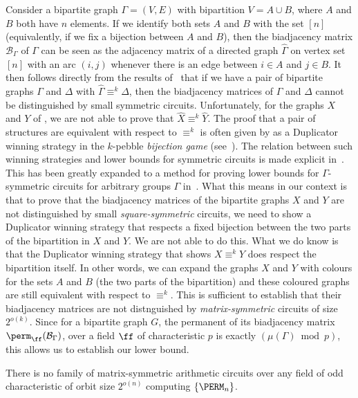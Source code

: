 \documentclass{toc}
\begin{document}
Consider a bipartite graph $\Gamma= (V,E)$ with bipartition $V= A \cup B$,
where $A$ and $B$ both have $n$ elements.  If we identify both sets
$A$ and $B$ with the set $[n]$ (equivalently, if we fix a bijection
between $A$ and $B$), then the biadjacency matrix $\mathcal{B}_\Gamma$ of
$\Gamma$ can be seen as the adjacency matrix of a directed graph $\hat{\Gamma}$
on vertex set $[n]$ with an arc $(i,j)$ whenever there is an edge
between $i \in A$ and $j \in B$.  It then follows directly from the
results of~\cite{AndersonD17} that if we have a pair of bipartite graphs $\Gamma$ and $\Delta$ with $\hat{\Gamma} \equiv^k \hat{\Delta}$, then the biadjacency matrices of $\Gamma$ and $\Delta$ cannot be distinguished by small symmetric circuits.  Unfortunately, for the graphs $X$ and $Y$ of , we are not able to prove that $\hat{X} \equiv^k \hat{Y}$. 
The proof that a pair of structures are equivalent with respect to $\equiv^k$ is often given by as a Duplicator winning strategy in the $k$-pebble \emph{bijection game} (see~\cite{DR07}).  The relation between such winning strategies and lower bounds for symmetric circuits is made explicit in~\cite{Dawar2016}.  This has been greatly expanded to a method for proving  lower bounds for $\Gamma$-symmetric circuits for arbitrary groups $\Gamma$ in~\cite{DWitcs22}.  What this means in our context is that to prove that the biadjacency matrices of the bipartite graphs $X$ and $Y$ are not distinguished by small
\emph{square-symmetric} %
circuits, we need to show a Duplicator winning strategy that respects a fixed bijection between the two parts of the bipartition in $X$ and $Y$.  We are not able to do this.  What we do know is that the Duplicator winning strategy that shows $X \equiv^k Y$ does respect the bipartition itself.  In other words, we can expand the graphs $X$ and $Y$ with colours for the sets $A$ and $B$ (the two parts of the bipartition) and these coloured graphs are still equivalent with respect to  $\equiv^k$.  This is sufficient to establish that their biadjacency matrices are not distnguished by \emph{matrix-symmetric} circuits of size $2^{o(k)}$.  Since for a bipartite graph $G$, the permanent of its biadjacency matrix $\perm_{\ff}(\mathcal{B}_\Gamma)$, over a field $\ff$ of characteristic $p$ is exactly $(\mu(\Gamma) \bmod p)$, this allows us to establish our lower bound.
\begin{theorem}\label{thm:lowerbound-matrix}
  There is no family of matrix-symmetric arithmetic circuits over any field of
  odd characteristic of orbit size $2^{o(n)}$ computing
  $\{\PERM_n\}$.
\end{theorem}
\end{document}
